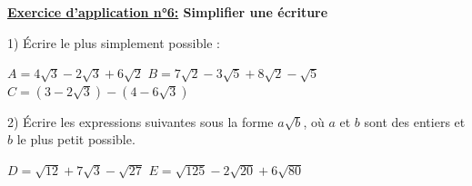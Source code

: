 \documentclass[12pt]{article}
\begin{document}
\begin{mdframed}[
    linewidth=1pt,
    roundcorner=5pt,
    linecolor=RoyalBlue,
    innertopmargin=10pt,
    innerbottommargin=10pt
]
{\color{RoyalBlue}
\textbf{\underline{Exercice d'application n°6:} Simplifier une écriture}}

\vspace{5pt}
\hspace{1cm}1) Écrire le plus simplement possible : 

\vspace{5pt}
$A = 4\sqrt{3} - 2\sqrt{3} + 6\sqrt{2}$ \hspace{1cm} $B = 7\sqrt{2} - 3\sqrt{5} + 8\sqrt{2} - \sqrt{5}$ 
\hspace{1cm} $C = (3 - 2\sqrt{3}) - (4 - 6\sqrt{3})$

\vspace{10pt}
\hspace{1cm}2) Écrire les expressions suivantes sous la forme $a\sqrt{b}$, où $a$ et $b$ sont des entiers 
et $b$ le plus petit possible.

\vspace{5pt}
$D = \sqrt{12} + 7\sqrt{3} - \sqrt{27}$ \hspace{1cm} $E = \sqrt{125} - 2\sqrt{20} + 6\sqrt{80}$

\vspace{0.5cm}
{\color{black!30}\dotfill}

\vspace{0.5cm}
{\color{black!30}\dotfill}

\vspace{0.5cm}
{\color{black!30}\dotfill}

\vspace{0.5cm}
{\color{black!30}\dotfill}

\vspace{0.5cm}
{\color{black!30}\dotfill}

\vspace{0.5cm}
{\color{black!30}\dotfill}

\vspace{0.5cm}
{\color{black!30}\dotfill}

\vspace{0.5cm}
{\color{black!30}\dotfill}

\vspace{0.5cm}
{\color{black!30}\dotfill}

\vspace{0.5cm}
{\color{black!30}\dotfill}

\vspace{0.5cm}
{\color{black!30}\dotfill}

\vspace{0.5cm}
{\color{black!30}\dotfill}

\vspace{0.5cm}
{\color{black!30}\dotfill}

\vspace{0.5cm}
{\color{black!30}\dotfill}

\vspace{0.5cm}
{\color{black!30}\dotfill}

\vspace{20pt}

\end{mdframed}
\end{document}
